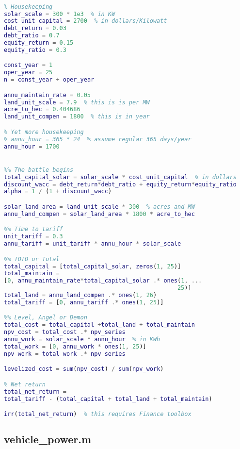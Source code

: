 \documentclass[12pt]{article}
\begin{document}
\begin{lstlisting}[language=Matlab]
%% Levelized cost of energy

% Housekeeping
solar_scale = 300 * 1e3  % in KW
cost_unit_capital = 2700  % in dollars/Kilowatt
debt_return = 0.03
debt_ratio = 0.7
equity_return = 0.15
equity_ratio = 0.3

const_year = 1
oper_year = 25
n = const_year + oper_year

annu_maintain_rate = 0.05
land_unit_scale = 7.9  % this is is per MW
acre_to_hec = 0.404686
land_unit_compen = 1800  % this is in year

% Yet more housekeeping
% annu_hour = 365 * 24  % assume regular 365 days/year
annu_hour = 1700


%% The battle begins
total_capital_solar = solar_scale * cost_unit_capital  % in dollars
discount_wacc = debt_return*debt_ratio + equity_return*equity_ratio
alpha = 1 / (1 + discount_wacc)

solar_land_area = land_unit_scale * 300  % acres and MW
annu_land_compen = solar_land_area * 1800 * acre_to_hec

%% Time to tariff
unit_tariff = 0.3
annu_tariff = unit_tariff * annu_hour * solar_scale

%% TOTO or Total
total_capital = [total_capital_solar, zeros(1, 25)]
total_maintain = 
[0, annu_maintain_rate*total_capital_solar .* ones(1, ...
                                                  25)]
total_land = annu_land_compen .* ones(1, 26)
total_tariff = [0, annu_tariff .* ones(1, 25)]

%% Level, Angel or Demon
total_cost = total_capital +total_land + total_maintain
npv_cost = total_cost .* npv_series
annu_work = solar_scale * annu_hour  % in KWh
total_work = [0, annu_work * ones(1, 25)]
npv_work = total_work .* npv_series

levelized_cost = sum(npv_cost) / sum(npv_work)

% Net return
total_net_return = 
total_tariff - (total_capital + total_land + total_maintain)

irr(total_net_return)  % this requires Finance toolbox

\end{lstlisting}

\subsection{vehicle\_power.m}
\label{sec:vehicle_power.m}
\end{document}
